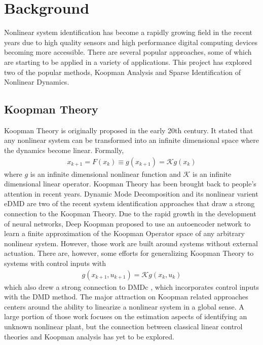 \documentclass[10pt,twocolumn]{article}
\begin{document}
\section{Background}

Nonlinear system identification has become a rapidly growing field in the recent years due to
high quality sensors and high performance digital computing devices becoming more accessible.
There are several popular approaches, some of which are starting to be applied in a
variety of applications.
This project has explored two of the popular methods, Koopman Analysis and Sparse
Identification of Nonlinear Dynamics.

\subsection{Koopman Theory}
Koopman Theory is originally proposed in the early 20th century. It stated that any nonlinear
system can be transformed into an infinite dimensional space where the dynamics become
linear. Formally,
\begin{gather}\label{eqa:koopman}
  x_{k+1} = F(x_k) \equiv
  g(x_{k+1}) = \mathcal{K} g(x_k)
\end{gather}
where $g$ is an infinite dimensional nonlinear function and $\mathcal{K}$ is an
infinite dimensional linear operator. Koopman Theory has been brought back to people's
attention in recent years. Dynamic Mode Decomposition \cite{dmd} and its nonlinear
varient eDMD \cite{edmd} are two of the recent system identification approaches that
draw a strong connection to the Koopman Theory. Due to the rapid growth in the development
of neural networks, Deep Koopman \cite{deepkoopman} proposed to use an autoencoder network to learn
a finite approximation of the Koopman Operator space of any arbitrary nonlinear system.
However, those work are built around systems without external actuation.
There are, however, some efforts \cite{generalkoopman}
for generalizing Koopman Theory to systems with control inputs with
\begin{gather}\label{eqa:koopman_ctrl}
  g(x_{k+1}, u_{k+1}) = \mathcal{K}g(x_k, u_k)
\end{gather}
which also drew a strong connection to DMDc \cite{dmdc}, which incorporates
control inputs with the
DMD method. The major attraction on Koopman related approaches centers around the ability
to linearize a nonlinear system in a global sense. A large portion of those work
focuses on the estimation
aspects of identifying an unknown nonlinear plant, but the connection between classical
linear control theories and Koopman analysis has yet to be explored.
\end{document}
